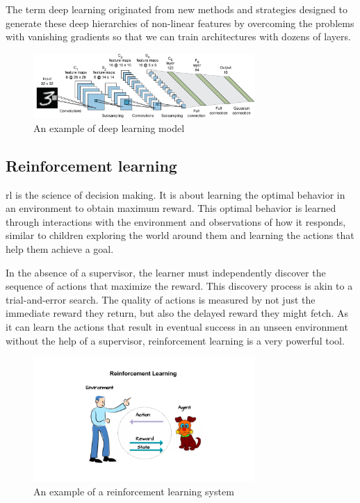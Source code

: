 The term deep learning originated from new methods and strategies designed to generate these deep hierarchies of non-linear features by overcoming the problems with vanishing gradients so that we can train architectures with dozens of layers.

\begin{figure}[H]
	\centering
	\includegraphics[width=0.75\textwidth]{Figures/CNN.png}
	\caption{An example of deep learning model}
\end{figure}
\FloatBarrier

\subsection{Reinforcement learning}
\acrfull{rl} is the science of decision making. It is about learning the optimal behavior in an environment to obtain maximum reward. This optimal behavior is learned through interactions with the environment and observations of how it responds, similar to children exploring the world around them and learning the actions that help them achieve a goal.

In the absence of a supervisor, the learner must independently discover the sequence of actions that maximize the reward. This discovery process is akin to a trial-and-error search. The quality of actions is measured by not just the immediate reward they return, but also the delayed reward they might fetch. As it can learn the actions that result in eventual success in an unseen environment without the help of a supervisor, reinforcement learning is a very powerful tool.
\begin{figure}[H]
	\centering
	\includegraphics[width=0.75\textwidth]{Figures/RLCartoon.png}
	\caption{An example of a reinforcement learning system}
\end{figure}
\FloatBarrier


